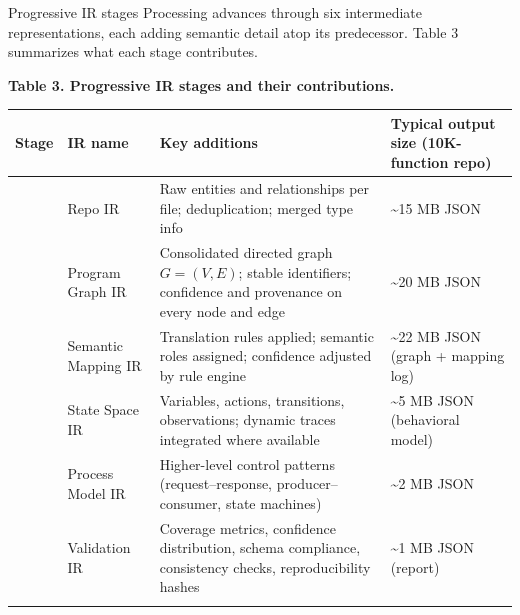 \documentclass[
  ignorenonframetext,
]{beamer}
\newcounter{none} %
\begin{document}
\begin{frame}{Progressive IR stages}
\protect{}\label{progressive-ir-stages}
Processing advances through six intermediate representations, each
adding semantic detail atop its predecessor. Table 3 summarizes what
each stage contributes.

\textbf{Table 3. Progressive IR stages and their contributions.}

{\def\LTcaptype{none} %
\begin{longtable}[]{@{}
  >{\raggedright\arraybackslash}p{}
  >{\raggedright\arraybackslash}p{}
  >{\raggedright\arraybackslash}p{}
  >{\raggedright\arraybackslash}p{}@{}}
\toprule\noalign{}
\begin{minipage}[b]{\linewidth}\raggedright
Stage
\end{minipage} & \begin{minipage}[b]{\linewidth}\raggedright
IR name
\end{minipage} & \begin{minipage}[b]{\linewidth}\raggedright
Key additions
\end{minipage} & \begin{minipage}[b]{\linewidth}\raggedright
Typical output size (10K-function repo)
\end{minipage} \\
\midrule\noalign{}
\endhead
1 & Repo IR & Raw entities and relationships per file; deduplication;
merged type info & \textasciitilde15 MB JSON \\
2 & Program Graph IR & Consolidated directed graph \(G=(V,E)\); stable
identifiers; confidence and provenance on every node and edge &
\textasciitilde20 MB JSON \\
3 & Semantic Mapping IR & Translation rules applied; semantic roles
assigned; confidence adjusted by rule engine & \textasciitilde22 MB JSON
(graph + mapping log) \\
4 & State Space IR & Variables, actions, transitions, observations;
dynamic traces integrated where available & \textasciitilde5 MB JSON
(behavioral model) \\
5 & Process Model IR & Higher-level control patterns (request--response,
producer--consumer, state machines) & \textasciitilde2 MB JSON \\
6 & Validation IR & Coverage metrics, confidence distribution, schema
compliance, consistency checks, reproducibility hashes &
\textasciitilde1 MB JSON (report) \\
\bottomrule\noalign{}
\end{longtable}
}


\end{frame}
\end{document}
